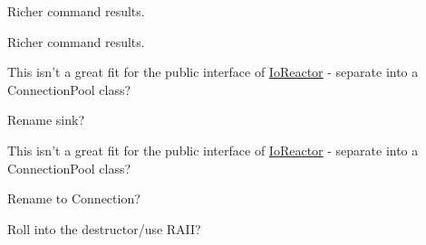 
\begin{DoxyRefList}
\item[\label{todo__todo000001}%
\hypertarget{todo__todo000001}{}%
Member \hyperlink{classCommandHandler_a22ac65683643c6f6037441a8e5fd04d4}{Command\+Handler\+:\+:Run\+Nullary} (const std\+::string \&cmd)]Richer command results.  
\item[\label{todo__todo000002}%
\hypertarget{todo__todo000002}{}%
Member \hyperlink{classCommandHandler_a75904aa3532bba1e548fbcff00544d46}{Command\+Handler\+:\+:Run\+Unary} (const std\+::string \&cmd, const std\+::string \&arg)]Richer command results.  
\item[\label{todo__todo000004}%
\hypertarget{todo__todo000004}{}%
Member \hyperlink{classIoReactor_a535c6ff0899391afc02c87b1dfe7c6e2}{Io\+Reactor\+:\+:New\+Connection} (uv\+\_\+stream\+\_\+t $\ast$server)]This isn't a great fit for the public interface of \hyperlink{classIoReactor}{Io\+Reactor} -\/ separate into a Connection\+Pool class?  
\item[\label{todo__todo000005}%
\hypertarget{todo__todo000005}{}%
Member \hyperlink{classIoReactor_af31bb722acf08d10eaa46ea7a1a5d4ca}{Io\+Reactor\+:\+:Remove\+Connection} (\hyperlink{classTcpResponseSink}{Tcp\+Response\+Sink} \&sink)]Rename sink? 

This isn't a great fit for the public interface of \hyperlink{classIoReactor}{Io\+Reactor} -\/ separate into a Connection\+Pool class?  
\item[\label{todo__todo000003}%
\hypertarget{todo__todo000003}{}%
Class \hyperlink{classTcpResponseSink}{Tcp\+Response\+Sink} ]Rename to Connection?  
\item[\label{todo__todo000006}%
\hypertarget{todo__todo000006}{}%
Member \hyperlink{classTcpResponseSink_a2e40c526177918ade20bec1e4f66698a}{Tcp\+Response\+Sink\+:\+:Close} ()]Roll into the destructor/use R\+A\+I\+I? 
\end{DoxyRefList}